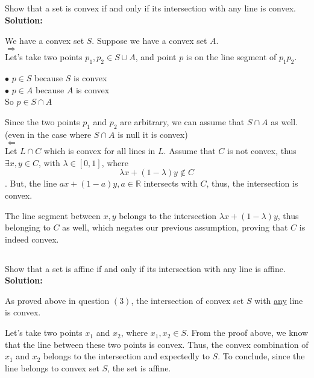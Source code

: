 \documentclass[10pt]{article}
\newcommand{\R}{\mathbb{R}}
\begin{document}
  	
  	\begin{center}
  	\section{}
  	\end{center}\par
  	Show that a set is convex if and only if its intersection with any line is convex.\\
  	\textbf{Solution:}\par
  	We have a convex set $S$. Suppose we have a convex set $A$.\\
  	\textbf{$\Rightarrow$}\\
  	Let's take two points $p_1, p_2 \in S \cup A$, and point $p$ is on the line segment of $p_1p_2$.
  	\begin{center}
  	$\bullet$  $p \in S$ because $S$ is convex\\
  	$\bullet$  $p \in A$ because $A$ is convex\\
  	So $p \in S \cap A$\\
  	\end{center}
  	Since the two points $p_1$ and $p_2$ are arbitrary, we can assume that $S \cap A$ as well. (even in the case where $S \cap A$ is null it is convex) \\
  	\textbf{$\Leftarrow$}\\
  	Let $L \cap C$ which is convex for all lines in $L$. Assume that $C$ is not convex, thus $\exists x,y \in C$, with $\lambda \in [0,1]$, where $$\lambda x + (1 - \lambda)y \notin C$$. But, the line $ax + (1 - a)y, a \in \R$ intersects with $C$, thus, the intersection is convex.\par 
  	The line segment between $x,y$ belongs to the intersection $\lambda x + (1 - \lambda)y$, thus belonging to $C$ as well, which negates our previous assumption, proving that $C$ is indeed convex.
  	\newpage
  	
  	\begin{center}
  	\section{}
  	\end{center}\par
  	  	Show that a set is affine if and only if its intersection with any line is affine.\\
  	\textbf{Solution:}\par
  	As proved above in question $(3)$, the intersection of convex set $S$ with \underline{any} line is convex.\par
  	Let's take two points $x_1$ and $x_2$, where $x_1, x_2 \in S$. From the proof above, we know that the line between these two points is convex. Thus, the convex combination of $x_1$ and $x_2$ belongs to the intersection and expectedly to $S$. To conclude, since the line belongs to convex set $S$, the set is affine.
  	\newpage
\end{document}
